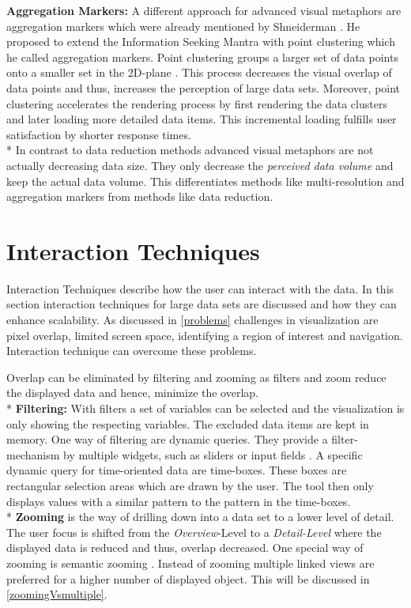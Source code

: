 \textbf{Aggregation Markers:}\label{aggregationmarkers} A different approach for advanced visual metaphors are aggregation markers which were already mentioned by Shneiderman  \cite{Shneiderman2008}. He proposed to extend the Information Seeking Mantra  \cite{Shneiderman1996} with point clustering which he called aggregation markers. Point clustering groups a larger set of data points onto a smaller set in the 2D-plane  \cite{Morrison2014}. This process decreases the visual overlap of data points and thus, increases the perception of large data sets. Moreover, point clustering accelerates the rendering process by first rendering the data clusters  and later loading more detailed data items. This incremental loading fulfills user satisfaction by shorter response times.\\*
In contrast to data reduction methods advanced visual metaphors are not actually decreasing data size. They only decrease the \textit{perceived data volume} and keep the actual data volume. This differentiates methods like multi-resolution and aggregation markers from methods like data reduction. 


\section{Interaction Techniques}
Interaction Techniques describe how the user can interact with the data. In this section interaction techniques for large data sets are discussed and how they can enhance scalability. As discussed in \ref{problems} challenges in visualization are pixel overlap, limited screen space, identifying a region of interest and navigation. Interaction technique can overcome these problems. 
\par
Overlap can be eliminated by filtering and zooming as filters and zoom reduce the displayed data and hence, minimize the overlap. \\*
\textbf{Filtering:} With filters a set of variables can be selected and the visualization is only showing the respecting variables. The excluded data items are kept in memory.
One way of filtering are dynamic queries. They provide a filter-mechanism by multiple widgets, such as sliders or input fields  \cite{Hochheiser2004,Shneiderman2008,Aigner2011}. A specific dynamic query for time-oriented data are time-boxes. These boxes are rectangular selection areas which are drawn by the user. The tool then only displays values with a similar pattern to the pattern in the time-boxes.\\*
\textbf{Zooming} is the way of drilling down into a data set to a lower level of detail. The user focus is shifted from the \textit{Overview}-Level to a \textit{Detail-Level} where the displayed data is reduced and thus, overlap decreased. One special way of zooming is semantic zooming  \cite{Boulos2003}. Instead of zooming multiple linked views are preferred for a higher number of displayed object. This will be discussed in \ref{zoomingVsmultiple}. 
\par

